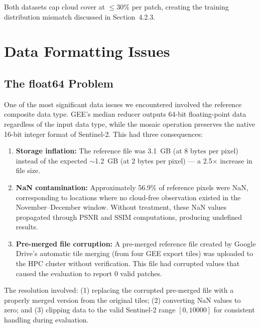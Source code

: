 \documentclass[12pt,a4paper]{article}
\begin{document}
Both datasets cap cloud cover at $\leq$30\% per patch, creating the training distribution mismatch discussed in Section~4.2.3.



\section{Data Formatting Issues}

\subsection{The float64 Problem}

One of the most significant data issues we encountered involved the reference composite data type. GEE's median reducer outputs 64-bit floating-point data regardless of the input data type, while the mosaic operation preserves the native 16-bit integer format of Sentinel-2. This had three consequences:

\begin{enumerate}[leftmargin=2em]
    \item \textbf{Storage inflation:} The reference file was 3.1~GB (at 8 bytes per pixel) instead of the expected ${\sim}$1.2~GB (at 2 bytes per pixel) --- a 2.5$\times$ increase in file size.
    
    \item \textbf{NaN contamination:} Approximately 56.9\% of reference pixels were NaN, corresponding to locations where no cloud-free observation existed in the November--December window. Without treatment, these NaN values propagated through PSNR and SSIM computations, producing undefined results.
    
    \item \textbf{Pre-merged file corruption:} A pre-merged reference file created by Google Drive's automatic tile merging (from four GEE export tiles) was uploaded to the HPC cluster without verification. This file had corrupted values that caused the evaluation to report 0 valid patches.
\end{enumerate}

The resolution involved: (1) replacing the corrupted pre-merged file with a properly merged version from the original tiles; (2) converting NaN values to zero; and (3) clipping data to the valid Sentinel-2 range $[0, 10000]$ for consistent handling during evaluation.
\end{document}
